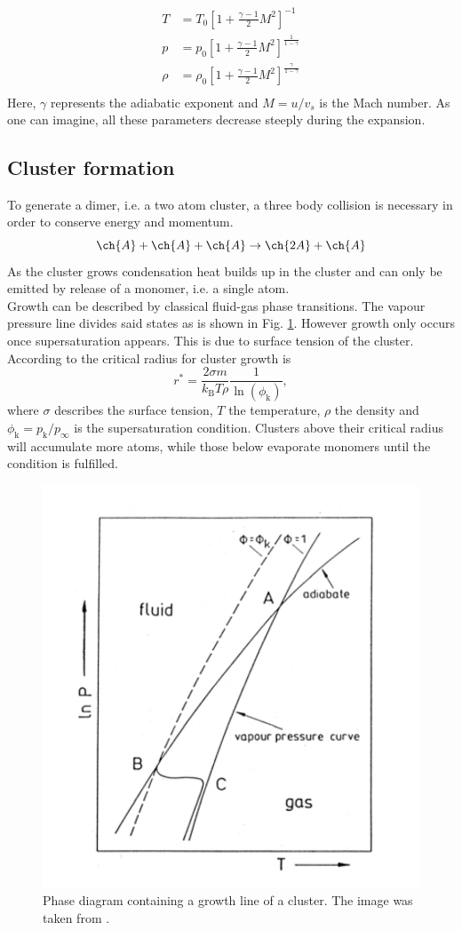 \documentclass[a4paper,10pt]{article}
\begin{document}
\begin{equation}
	\begin{split}
	T &= T_0 \left[1 + \frac{\gamma - 1}{2} M^2 \right]^{-1} \\
	p &= p_0 \left[1 + \frac{\gamma - 1}{2} M^2 \right]^{\frac{1}{1 - \gamma}} \\
	\rho &= \rho_0 \left[1 + \frac{\gamma - 1}{2} M^2 \right]^{\frac{\gamma}{1-\gamma}} \\
	\end{split}
\end{equation}
Here, $\gamma$ represents the adiabatic exponent and $M = u/v_s$ is the Mach number. As one can imagine, all these parameters decrease steeply during the expansion.

\subsection{Cluster formation}
To generate a dimer, i.e. a two atom cluster, a three body collision is necessary in order to conserve energy and momentum.
\begin{equation}
	\ch{A} + \ch{A} + \ch{A} \rightarrow \ch{2 A} + \ch{A}
\end{equation}
As the cluster grows condensation heat builds up in the cluster and can only be emitted by release of a monomer, i.e. a single atom. \\
Growth can be described by classical fluid-gas phase transitions. The vapour pressure line divides said states as is shown in Fig. \ref{fig_formation}. However growth only occurs once supersaturation appears. This is due to surface tension of the cluster. According to \cite{script} the critical radius for cluster growth is
\begin{equation}
	r^\ast = \frac{2 \sigma m}{k_\mathrm{B} T \rho} \frac{1}{\ln(\phi_\mathrm{k})},
\end{equation}
where $\sigma$ describes the surface tension, $T$ the temperature, $\rho$ the density and $\phi_\mathrm{k} = p_\mathrm{k} / p_\infty$ is the supersaturation condition. Clusters above their critical radius will accumulate more atoms, while those below evaporate monomers until the condition is fulfilled.
\begin{figure}
	\centering
	\includegraphics[width = 0.5 \textwidth]{formation.png}
	\caption{Phase diagram containing a growth line of a cluster. The image was taken from \cite{script}. }
	\label{fig_formation}
\end{figure}
\end{document}
